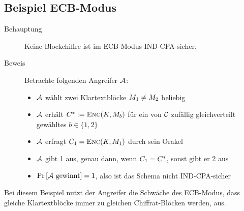 \subsection{Beispiel ECB-Modus}
\begin{description} 
	\item[Behauptung] Keine Blockchiffre ist im ECB-Modus IND-CPA-sicher.
	\item[Beweis] Betrachte folgenden Angreifer $\mathcal{A}$:
	\begin{itemize}
		\item $\mathcal{A}$ wählt zwei Klartextblöcke $M_1 \neq M_2$ beliebig
		\item $\mathcal{A}$ erhält  $C^{*} := \textsc{Enc}(K, M_{b})$ für ein von $\mathcal{C}$ zufällig gleichverteilt gewähltes $b \in \{1, 2\}$
		\item $\mathcal{A}$ erfragt $C_1 = \textsc{Enc}(K, M_1)$ durch sein Orakel
		\item $\mathcal{A}$ gibt 1 aus, genau dann, wenn $C_1 = C^{*}$, sonst gibt er 2 aus
		\item $\Pr \left[ \mathcal{A} \text{ gewinnt} \right] = 1$, also ist das Schema nicht IND-CPA-sicher
	\end{itemize}
\end{description}
Bei diesem Beispiel nutzt der Angreifer die Schwäche des ECB-Modus, dass gleiche Klartextblöcke immer zu gleichen Chiffrat-Blöcken werden, aus.

